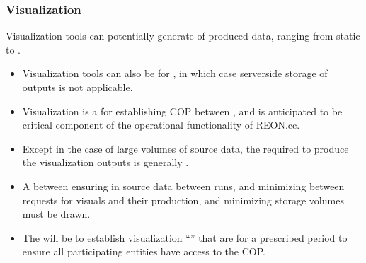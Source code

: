 \documentclass[letterpaper,12pt,english]{book}
\begin{document}
\subsubsection{Visualization}
\label{\detokenize{requirements/information/visualization:visualization}}\label{\detokenize{requirements/information/visualization::doc}}
\sphinxAtStartPar
Visualization tools can potentially generate  of produced data, ranging from static  to .
\begin{itemize}
\item {} 
\sphinxAtStartPar
Visualization tools can also be  for , in which case server\sphinxhyphen{}side storage of outputs is not applicable.

\item {} 
\sphinxAtStartPar
Visualization is a  for establishing COP between , and is anticipated to be critical component of the operational functionality of REON.cc.

\item {} 
\sphinxAtStartPar
Except in the case of large volumes of source data, the  required to produce the visualization outputs is generally .

\item {} 
\sphinxAtStartPar
A  between ensuring  in source data between runs, and minimizing  between requests for visuals and their production, and minimizing storage volumes must be drawn.

\item {} 
\sphinxAtStartPar
The  will be to establish visualization “” that are  for a prescribed period to ensure all participating entities have access to the COP.

\end{itemize}
\end{document}

